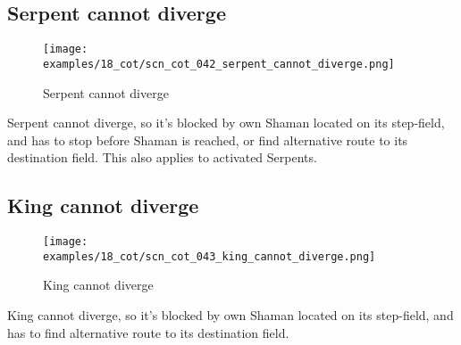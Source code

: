 \subsection*{Serpent cannot diverge}
\label{sec:Conquest of Tlalocan/Divergence/Serpent cannot diverge}

\vspace*{-1.4\baselineskip}
\noindent
\begin{figure}[!h]
\texttt{[image: examples/18\_cot/scn\_cot\_042\_serpent\_cannot\_diverge.png]}
\vspace*{-1.3\baselineskip}
\caption{Serpent cannot diverge}
\label{fig:scn_cot_042_serpent_cannot_diverge}
\end{figure}

\vspace*{-0.5\baselineskip}
Serpent cannot diverge, so it's blocked by own Shaman located on its step-field, and
has to stop before Shaman is reached, or find alternative route to its destination
field. This also applies to activated Serpents.


\subsection*{King cannot diverge}
\label{sec:Conquest of Tlalocan/Divergence/King cannot diverge}

\noindent
\begin{wrapfigure}[4]{l}{0.4\textwidth}
\centering
\texttt{[image: examples/18\_cot/scn\_cot\_043\_king\_cannot\_diverge.png]}
\caption{King cannot diverge}
\label{fig:scn_cot_043_king_cannot_diverge}
\end{wrapfigure}
King cannot diverge, so it's blocked by own Shaman located on its step-field,
and has to find alternative route to its destination field.

\clearpage %

